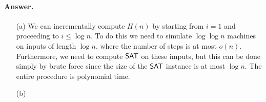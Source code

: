 \paragraph{Answer.} \begin{itemize}
	\item[(a)] We can incrementally compute $H(n)$ by starting from $i=1$ and proceeding to $i\leq\log n$. To do this we need to simulate $\log\log n$ machines on inputs of length $\log n$, where the number of steps is at most $o(n)$. Furthermore, we need to compute $\mathsf{SAT}$ on these imputs, but this can be done simply by brute force since the size of the $\mathsf{SAT}$ instance is at most $\log n$. The entire procedure is polynomial time.
	
	\item[(b)] 
\end{itemize}